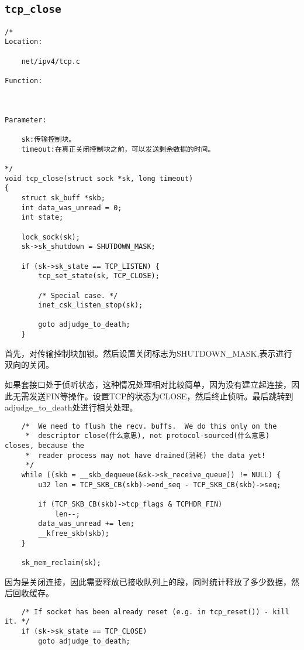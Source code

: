 	\subsection{\texttt{tcp_close}}
\begin{verbatim}
/*
Location:

	net/ipv4/tcp.c

Function:

		

Parameter:

	sk:传输控制块。
	timeout:在真正关闭控制块之前，可以发送剩余数据的时间。
	
*/
void tcp_close(struct sock *sk, long timeout)
{
	struct sk_buff *skb;
	int data_was_unread = 0;
	int state;

	lock_sock(sk);
	sk->sk_shutdown = SHUTDOWN_MASK;

	if (sk->sk_state == TCP_LISTEN) {
		tcp_set_state(sk, TCP_CLOSE);

		/* Special case. */
		inet_csk_listen_stop(sk);

		goto adjudge_to_death;
	}
\end{verbatim}

		首先，对传输控制块加锁。然后设置关闭标志为SHUTDOWN\_MASK,表示进行双向的关闭。

		如果套接口处于侦听状态，这种情况处理相对比较简单，因为没有建立起连接，因此无需发送FIN等操作。设置TCP的状态为CLOSE，然后终止侦听。最后跳转到adjudge\_to\_death处进行相关处理。

\begin{verbatim}
	/*  We need to flush the recv. buffs.  We do this only on the
	 *  descriptor close(什么意思), not protocol-sourced(什么意思) closes, because the
	 *  reader process may not have drained(消耗) the data yet!
	 */
	while ((skb = __skb_dequeue(&sk->sk_receive_queue)) != NULL) {
		u32 len = TCP_SKB_CB(skb)->end_seq - TCP_SKB_CB(skb)->seq;

		if (TCP_SKB_CB(skb)->tcp_flags & TCPHDR_FIN)
			len--;
		data_was_unread += len;
		__kfree_skb(skb);
	}

	sk_mem_reclaim(sk);
\end{verbatim}

		因为是关闭连接，因此需要释放已接收队列上的段，同时统计释放了多少数据，然后回收缓存。

\begin{verbatim}
	/* If socket has been already reset (e.g. in tcp_reset()) - kill it. */
	if (sk->sk_state == TCP_CLOSE)
		goto adjudge_to_death;
\end{verbatim}

